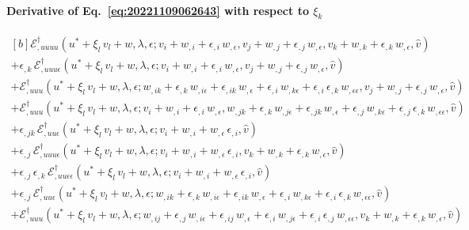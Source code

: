 \documentclass[12pt, final]{scrartcl}
\theoremstyle{definition}
\newcommand{\EE}{\mathcal E ^ \dagger}
\begin{document}
\paragraph{Derivative of Eq.~\eqref{eq:20221109062643} with respect to \(\xi_k\)}

\begin{equation}
  \begin{aligned}[b]
    \EE_{,uuuu}(u^\ast + \xi_l \, v_l + w, \lambda, \epsilon; v_i + w_{,i} + \epsilon_{,i} \,  w_{,\epsilon}, v_j + w_{,j} + \epsilon_{,j} \, w_{,\epsilon}, v_k + w_{,k} + \epsilon_{,k} \, w_{,\epsilon}, \hat{v})&\\
    + \epsilon_{,k} \, \EE_{,uuu\epsilon}(u^\ast + \xi_l \, v_l + w, \lambda, \epsilon; v_i + w_{,i} + \epsilon_{,i} \,  w_{,\epsilon}, v_j + w_{,j} + \epsilon_{,j} \, w_{,\epsilon}, \hat{v})&\\
    + \EE_{,uuu}(u^\ast + \xi_l \, v_l + w, \lambda, \epsilon; w_{,ik} + \epsilon_{,k} \, w_{,i\epsilon} + \epsilon_{,ik} \,  w_{,\epsilon} + \epsilon_{,i} \,  w_{,k\epsilon} + \epsilon_{,i} \, \epsilon_{,k}\,  w_{,\epsilon\epsilon}, v_j + w_{,j} + \epsilon_{,j} \, w_{,\epsilon}, \hat{v})&\\
    + \EE_{,uuu}(u^\ast + \xi_l \, v_l + w, \lambda, \epsilon; v_i + w_{,i} + \epsilon_{,i} \,  w_{,\epsilon}, w_{,jk} + \epsilon_{,k} \, w_{,j\epsilon} + \epsilon_{,jk} \,  w_{,\epsilon} + \epsilon_{,j} \,  w_{,k\epsilon} + \epsilon_{,j} \, \epsilon_{,k}\,  w_{,\epsilon\epsilon}, \hat{v})&\\
    + \epsilon_{,jk} \, \EE_{,uu\epsilon}(u^\ast + \xi_l \, v_l + w, \lambda, \epsilon; v_i + w_{,i} + w_{,\epsilon} \, \epsilon_{,i}, \hat{v})&\\
    + \epsilon_{,j} \, \EE_{,uuu\epsilon}(u^\ast + \xi_l \, v_l + w, \lambda, \epsilon; v_i + w_{,i} + w_{,\epsilon} \, \epsilon_{,i},  v_k + w_{,k} + \epsilon_{,k} \, w_{,\epsilon}, \hat{v})&\\
    + \epsilon_{,j} \, \epsilon_{,k} \, \EE_{,uu\epsilon\epsilon}(u^\ast + \xi_l \, v_l + w, \lambda, \epsilon; v_i + w_{,i} + w_{,\epsilon} \, \epsilon_{,i}, \hat{v})&\\
    + \epsilon_{,j} \, \EE_{,uu\epsilon}(u^\ast + \xi_l \, v_l + w, \lambda, \epsilon; w_{,ik} + \epsilon_{,k} \, w_{,i\epsilon} + \epsilon_{,ik} \,  w_{,\epsilon} + \epsilon_{,i} \,  w_{,k\epsilon} + \epsilon_{,i} \, \epsilon_{,k}\,  w_{,\epsilon\epsilon}, \hat{v})&\\
    + \EE_{,uuu}(u^\ast + \xi_l \, v_l + w, \lambda, \epsilon; w_{,ij} + \epsilon_{,j} \, w_{,i\epsilon} + \epsilon_{,ij} \, w_{,\epsilon} + \epsilon_{,i} \, w_{,j\epsilon} + \epsilon_{,i} \, \epsilon_{,j} \, w_{,\epsilon\epsilon},  v_k + w_{,k} + \epsilon_{,k} \, w_{,\epsilon}, \hat{v})&\\

\end{aligned}
\end{equation}
\end{document}
